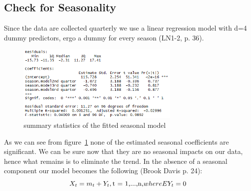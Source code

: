 \documentclass[11pt,a4paper]{article}
\begin{document}
\subsection{Check for Seasonality}
Since the data are collected quarterly we use a linear regression model with d=4 dummy predictors, ergo a dummy for every season (LN1-2, p. 36). 
\begin{figure}
\centering
\includegraphics[angle=0,
width=0.7\textwidth]{summary_seasonmodel}
\caption{summary statistics of the fitted seasonal model\label{fig:summary_seasonmodel}}
\end{figure}
As we can see from figure~\ref{fig:summary_seasonmodel} none of the estimated seasonal coefficients are significant. We can be sure now that they are no seasonal impacts on our data, hence what remains is to eliminate the trend. In the absence of a seasonal component our model becomes the following (Brook Davis p. 24):
\begin{equation}
X_t = m_t + Y_t, \text{t = 1,...,n,} 
\\where EY_t = 0
\end{equation} 
\end{document}
